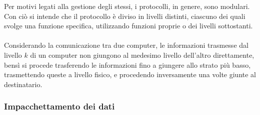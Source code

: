 \documentclass{subfiles}
\begin{document}
Per motivi legati alla gestione degli stessi, i protocolli, in genere, sono modulari.
Con ciò si intende che il protocollo è diviso in livelli distinti, ciascuno dei quali svolge una funzione specifica,
utilizzando funzioni proprie o dei livelli sottostanti.
\\ \\
Considerando la comunicazione tra due computer, le informazioni trasmesse dal livello \(k\) di un computer non giungono al medesimo livello dell'altro direttamente,
bensì si procede trasferendo le informazioni fino a giungere allo strato più basso,
trasmettendo queste a livello fisico, e procedendo inversamente una volte giunte al destinatario.

\subsubsection{Impacchettamento dei dati}

\end{document}
